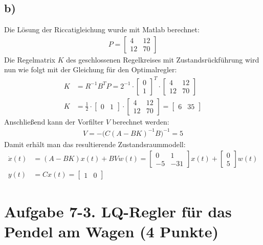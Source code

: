 \documentclass[11pt]{scrartcl} %
\begin{document}
\subsection*{b)}
Die Lösung der Riccatigleichung wurde mit Matlab berechnet:
\begin{align*}
	P=\begin{bmatrix}4&12\\12&70\end{bmatrix}
\end{align*}
Die Regelmatrix $K$ des geschlossenen Regelkreises mit Zustandsrückführung wird nun wie folgt mit der Gleichung für den Optimalregler:
\begin{align*}
	K&=R^{-1}B^TP=2^{-1}\cdot\begin{bmatrix}0\\1\end{bmatrix}^T\cdot\begin{bmatrix}4&12\\12&70\end{bmatrix}\\
	K&=\frac{1}{2}\cdot\begin{bmatrix}0&1\end{bmatrix}\cdot\begin{bmatrix}4&12\\12&70\end{bmatrix}=\begin{bmatrix}6&35\end{bmatrix}
\end{align*}
Anschließend kann der Vorfilter $V$ berechnet werden:
\begin{align*}
	V=-\bigl(C(A-BK)^{-1}B\bigr)^{-1}=5
\end{align*}
Damit erhält man das resultierende Zustandsraummodell:
\begin{align*}
	\dot{x}(t)&=(A-BK)x(t)+BVw(t)=\begin{bmatrix}0&1\\-5&-31\end{bmatrix}x(t)+\begin{bmatrix}0\\5\end{bmatrix}w(t)\\
	y(t)&=Cx(t)=\begin{bmatrix}1&0\end{bmatrix}
\end{align*}


\section*{Aufgabe 7-3. LQ-Regler für das Pendel am Wagen (4 Punkte)}
\end{document}
